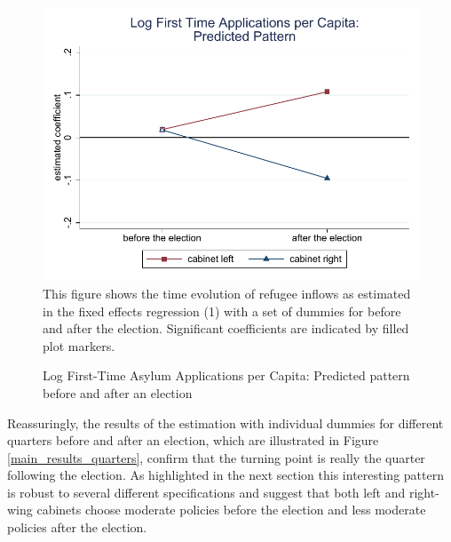 \documentclass[a4paper,12pt]{article}
\begin{document}
 \begin{figure}
	\centering
    	\caption{Log First-Time Asylum Applications per Capita: Predicted pattern before and after an election}
	\includegraphics[width=1\textwidth]{inputs/app_Graph1_baseline.pdf}
    {\footnotesize This figure shows the time evolution of refugee inflows as estimated in the fixed effects regression (1) with a set of dummies for before and after the election. Significant coefficients are indicated by filled plot markers.}
	\label{main_results_bef-after}
\end{figure}

 Reassuringly, the results of the estimation with individual dummies for different quarters before and after an election, which are illustrated in Figure \ref{main_results_quarters}, confirm that the turning point is really the quarter following the election.  As highlighted in the next section this interesting pattern is robust to several different specifications and suggest that both left and right-wing cabinets choose moderate policies before the election and less moderate policies after the election.
\end{document}
